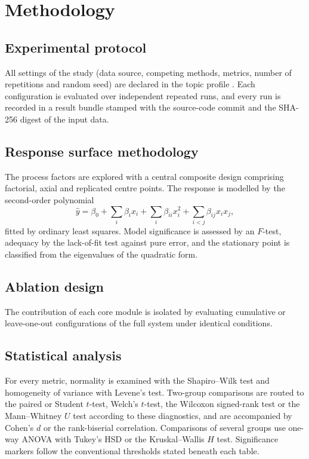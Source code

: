 \chapter{Methodology}
\label{chap:method}

\section{Experimental protocol}
All settings of the study (data source, competing methods, metrics, number of repetitions and
random seed) are declared in the topic profile \texttt{\ThesisProfileId}. Each configuration is
evaluated over independent repeated runs, and every run is recorded in a result bundle stamped
with the source-code commit and the SHA-256 digest of the input data.

\ifAutoHasRsm
\section{Response surface methodology}
The process factors are explored with a central composite design comprising factorial, axial and
replicated centre points. The response is modelled by the second-order polynomial
\begin{equation}
  \hat{y} = \beta_{0} + \sum_{i} \beta_{i} x_{i} + \sum_{i} \beta_{ii} x_{i}^{2}
            + \sum_{i<j} \beta_{ij} x_{i} x_{j},
\end{equation}
fitted by ordinary least squares. Model significance is assessed by an $F$-test, adequacy by the
lack-of-fit test against pure error, and the stationary point is classified from the eigenvalues
of the quadratic form.
\fi

\ifAutoHasAblation
\section{Ablation design}
The contribution of each core module is isolated by evaluating cumulative or leave-one-out
configurations of the full system under identical conditions.
\fi

\section{Statistical analysis}
For every metric, normality is examined with the Shapiro--Wilk test and homogeneity of variance
with Levene's test. Two-group comparisons are routed to the paired or Student $t$-test, Welch's
$t$-test, the Wilcoxon signed-rank test or the Mann--Whitney $U$ test according to these
diagnostics, and are accompanied by Cohen's $d$ or the rank-biserial correlation. Comparisons of
several groups use one-way ANOVA with Tukey's HSD or the Kruskal--Wallis $H$ test. Significance
markers follow the conventional thresholds stated beneath each table.
